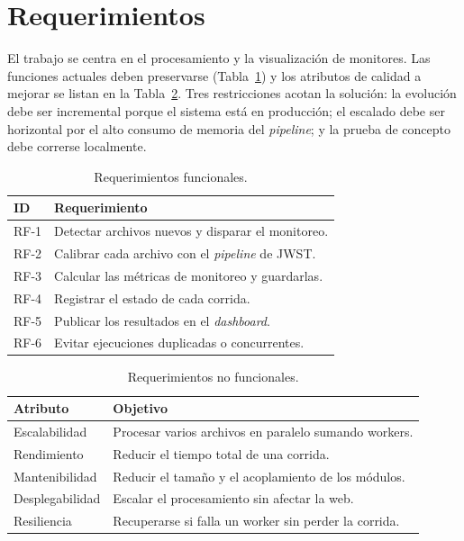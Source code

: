 \documentclass[conference]{IEEEtran}
\begin{document}
\section{Requerimientos}

El trabajo se centra en el procesamiento y la visualizaci\'on de monitores. Las funciones actuales deben preservarse (Tabla~\ref{tab:rf}) y los atributos de calidad a mejorar se listan en la Tabla~\ref{tab:rnf}. Tres restricciones acotan la soluci\'on: la evoluci\'on debe ser incremental porque el sistema est\'a en producci\'on; el escalado debe ser horizontal por el alto consumo de memoria del \textit{pipeline}; y la prueba de concepto debe correrse localmente.

\begin{table}[h]
\centering
\caption{Requerimientos funcionales.}
\label{tab:rf}
\begin{tabularx}{\columnwidth}{lX}
\toprule
\textbf{ID} & \textbf{Requerimiento} \\
\midrule
RF-1 & Detectar archivos nuevos y disparar el monitoreo. \\
RF-2 & Calibrar cada archivo con el \textit{pipeline} de JWST. \\
RF-3 & Calcular las m\'etricas de monitoreo y guardarlas. \\
RF-4 & Registrar el estado de cada corrida. \\
RF-5 & Publicar los resultados en el \textit{dashboard}. \\
RF-6 & Evitar ejecuciones duplicadas o concurrentes. \\
\bottomrule
\end{tabularx}
\end{table}

\begin{table}[h]
\centering
\caption{Requerimientos no funcionales.}
\label{tab:rnf}
\begin{tabularx}{\columnwidth}{lX}
\toprule
\textbf{Atributo} & \textbf{Objetivo} \\
\midrule
Escalabilidad & Procesar varios archivos en paralelo sumando workers. \\
Rendimiento & Reducir el tiempo total de una corrida. \\
Mantenibilidad & Reducir el tama\~no y el acoplamiento de los m\'odulos. \\
Desplegabilidad & Escalar el procesamiento sin afectar la web. \\
Resiliencia & Recuperarse si falla un worker sin perder la corrida. \\
\bottomrule
\end{tabularx}
\end{table}
\end{document}
